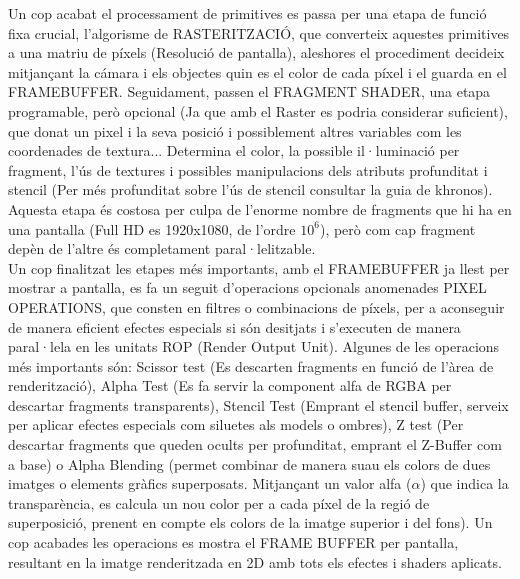 \documentclass[12pt]{article}
\begin{document}
Un cop acabat el processament de primitives es passa per una etapa de funció fixa crucial, l'algorisme de RASTERITZACIÓ, que converteix aquestes primitives a una matriu de píxels
(Resolució de pantalla), aleshores el procediment decideix mitjançant la cámara i els objectes quin es el color de cada píxel i el guarda en el FRAMEBUFFER. Seguidament, passen el FRAGMENT SHADER,
 una etapa programable, però opcional (Ja que amb el Raster es podria considerar suficient), que donat un pixel i la seva posició i possiblement altres variables com les coordenades de textura...
  Determina el color, la possible il·luminació per fragment, l'ús de textures i possibles manipulacions dels atributs profunditat i stencil (Per més profunditat sobre l'ús de stencil consultar la guia de khronos).
Aquesta etapa és costosa per culpa de l'enorme nombre de fragments que hi ha en una pantalla (Full HD es 1920x1080, de l'ordre $10^6$), però com cap fragment depèn de l'altre és completament paral·lelitzable.
\\

Un cop finalitzat les etapes més importants, amb el FRAMEBUFFER ja llest per mostrar a pantalla, es fa un seguit d'operacions opcionals anomenades PIXEL OPERATIONS, que consten en filtres o combinacions de píxels, per a aconseguir de manera eficient efectes especials si són desitjats i s'executen de manera paral·lela en les unitats ROP (Render Output Unit). Algunes de les operacions més importants són:
Scissor test (Es descarten fragments en funció de l'àrea de renderització), Alpha Test (Es fa servir la component alfa de RGBA per descartar fragments transparents), Stencil Test (Emprant el stencil buffer, serveix per
aplicar efectes especials com siluetes als models o ombres), Z test (Per descartar fragments que queden ocults per profunditat, emprant el Z-Buffer com a base) o Alpha Blending (permet combinar de manera suau els colors de dues imatges o elements gràfics superposats. Mitjançant un valor alfa (\(\alpha\)) que indica la transparència, es calcula un nou color per a cada píxel de la regió de superposició, prenent en compte els colors de la imatge superior i del fons).
Un cop acabades les operacions es mostra el FRAME BUFFER per pantalla, resultant en la imatge renderitzada en 2D amb tots els efectes i shaders aplicats.
\\ 
\end{document}
